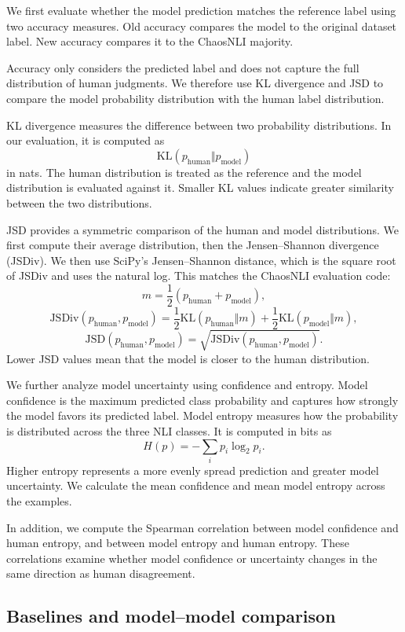 \documentclass[11pt,a4paper]{article}
\begin{document}
We first evaluate whether the model prediction matches the reference label using two accuracy measures. Old accuracy compares the model to the original dataset label. New accuracy compares it to the ChaosNLI majority.

Accuracy only considers the predicted label and does not capture the full distribution of human judgments. We therefore use KL divergence and JSD to compare the model probability distribution with the human label distribution.

KL divergence measures the difference between two probability distributions. In our evaluation, it is computed as
\[
\mathrm{KL}(p_{\mathrm{human}} \Vert p_{\mathrm{model}})
\]
in nats. The human distribution is treated as the reference and the model distribution is evaluated against it. Smaller KL values indicate greater similarity between the two distributions.

JSD provides a symmetric comparison of the human and model distributions. We first compute their average distribution, then the Jensen--Shannon divergence (JSDiv). We then use SciPy's Jensen--Shannon distance, which is the square root of JSDiv and uses the natural log. This matches the ChaosNLI evaluation code:
\[
m=\frac{1}{2}\left(p_{\mathrm{human}}+p_{\mathrm{model}}\right),
\]
\[
\mathrm{JSDiv}(p_{\mathrm{human}}, p_{\mathrm{model}}) =
\frac{1}{2}\mathrm{KL}(p_{\mathrm{human}}\Vert m)
+
\frac{1}{2}\mathrm{KL}(p_{\mathrm{model}}\Vert m),
\]
\[
\mathrm{JSD}(p_{\mathrm{human}}, p_{\mathrm{model}})=\sqrt{\mathrm{JSDiv}(p_{\mathrm{human}}, p_{\mathrm{model}})}.
\]
Lower JSD values mean that the model is closer to the human distribution.

We further analyze model uncertainty using confidence and entropy. Model confidence is the maximum predicted class probability and captures how strongly the model favors its predicted label. Model entropy measures how the probability is distributed across the three NLI classes. It is computed in bits as
\[
H(p)=-\sum_i p_i\log_2 p_i.
\]
Higher entropy represents a more evenly spread prediction and greater model uncertainty. We calculate the mean confidence and mean model entropy across the examples.

In addition, we compute the Spearman correlation between model confidence and human entropy, and between model entropy and human entropy. These correlations examine whether model confidence or uncertainty changes in the same direction as human disagreement.

\subsection{Baselines and model--model comparison}
\end{document}

